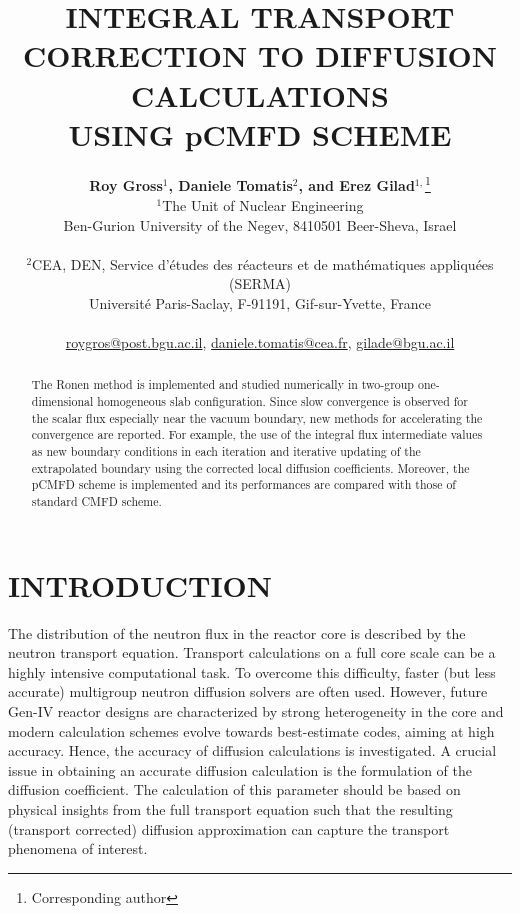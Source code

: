\documentclass[letterpaper]{physor2020}
\title{INTEGRAL TRANSPORT CORRECTION TO DIFFUSION CALCULATIONS\\USING pCMFD SCHEME}
\author{%
  \textbf{Roy Gross$^1$, Daniele Tomatis$^2$, and Erez Gilad$^{1,}$}\footnote{Corresponding author} \\
  $^1$The Unit of Nuclear Engineering \\
  Ben-Gurion University of the Negev, 8410501 Beer-Sheva, Israel\\ 
\\
  $^2$CEA, DEN, Service d’\'etudes des r\'eacteurs et
  de math\'ematiques appliqu\'ees (SERMA) \\
  Universit\'e Paris-Saclay, F-91191, Gif-sur-Yvette, France \\ 
\\
  \url{roygros@post.bgu.ac.il}, \url{daniele.tomatis@cea.fr}, \url{gilade@bgu.ac.il}
}
\begin{document}
\maketitle
\justify 

\begin{abstract}
  The Ronen method is implemented and studied numerically in two-group one-dimensional homogeneous slab configuration. Since slow convergence is observed for the scalar flux especially near the vacuum boundary, new methods for accelerating the convergence are reported. For example, the use of the integral flux intermediate values as new boundary conditions in each iteration and iterative updating of the extrapolated boundary using the corrected local diffusion coefficients. Moreover, the pCMFD scheme is implemented and its performances are compared with those of standard CMFD scheme.
\end{abstract}

\section{INTRODUCTION} 
\label{sec:intro}

The distribution of the neutron flux in the reactor core is described by the neutron transport equation. Transport calculations on a full core scale can be a highly intensive computational task. To overcome this difficulty, faster (but less accurate) multigroup neutron diffusion solvers are often used. However, future Gen-IV reactor designs are characterized by strong heterogeneity in the core and modern calculation schemes evolve towards best-estimate codes, aiming at high accuracy. Hence, the accuracy of diffusion calculations is investigated. A crucial issue in obtaining an accurate diffusion calculation is the formulation of the diffusion coefficient. The calculation of this parameter should be based on physical insights from the full transport equation such that the resulting (transport corrected) diffusion approximation can capture the transport phenomena of interest. 

\end{document}
